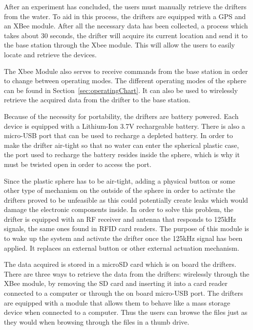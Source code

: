 
After an experiment has concluded, the users must manually retrieve the drifters from the water.  To aid in this process, the drifters are equipped with a GPS and an XBee module.  After all the necessary data has been collected, a process which takes about 30 seconds, the drifter will acquire its current location and send it to the base station through the Xbee module.  This will allow the users to easily locate and retrieve the devices.

The Xbee Module also serves to receive commands from the base station in order to change between operating modes. The different operating modes of the sphere can be found in Section~\ref{sec:operatingChart}.  It can also be used to wirelessly retrieve the acquired data from the drifter to the base station.


Because of the necessity for portability, the drifters are battery powered.  Each device is equipped with a Lithium-Ion 3.7V rechargeable battery.  There is also a micro-USB port that can be used to recharge a depleted battery.  In order to make the drifter air-tight so that no water can enter the spherical plastic case, the port used to recharge the battery resides inside the sphere, which is why it must be twisted open in order to access the port.


Since the plastic sphere has to be air-tight, adding a physical button or some other type of mechanism on the outside of the sphere in order to activate the drifters proved to be unfeasible as this could potentially create leaks which would damage the electronic components inside. In order to solve this problem, the drifter is equipped with an RF receiver and antenna that responds to 125kHz signals, the same ones found in RFID card readers.  The purpose of this module is to wake up the system and activate the drifter once the 125kHz signal has been applied.  It replaces an external button or other external actuation mechanism.


The data acquired is stored in a microSD card which is on board the drifters.  There are three ways to retrieve the data from the drifters: wirelessly through the XBee module, by removing the SD card and inserting it into a card reader connected to a computer or through the on board micro-USB port.  The drifters are equipped with a module that allows them to behave like a mass storage device when connected to a computer.  Thus the users can browse the files just as they would when browsing through the files in a thumb drive.

